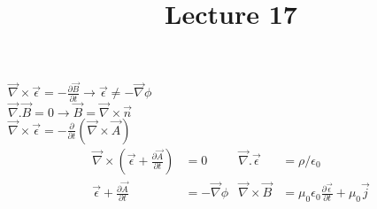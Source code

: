 \documentclass{article}
\begin{document}
\title{Lecture 17}
\maketitle

$\vec{\nabla}\times\vec{\epsilon}=-\frac{\partial\vec{B}}{\partial t}\rightarrow \vec{\epsilon}\neq-\vec{\nabla}\phi$\\

$\vec{\nabla}.\vec{B}=0 \rightarrow \vec{B}=\vec{\nabla}\times
\vec{n}$\\

$\vec{\nabla}\times\vec{\epsilon}=-\frac{\partial}{\partial t}\left(\vec{\nabla}\times\vec{A}\right)$\\

\begin{align}
\vec{\nabla}\times\left(\vec{\epsilon}+\frac{\partial\vec{A}}{\partial t}\right)& =0 & \vec{\nabla}.\vec{\epsilon} &=\rho/\epsilon_{0}\\
\vec{\epsilon}+\frac{\partial\vec{A}}{\partial t} &=-\vec{\nabla}\phi
& \vec{\nabla}\times\vec{B} &=\mu_{0}\epsilon_{0}\frac{\partial \vec{\epsilon}}{\partial t}+\mu_{0}\vec{j}
\end{align}
\end{document}
